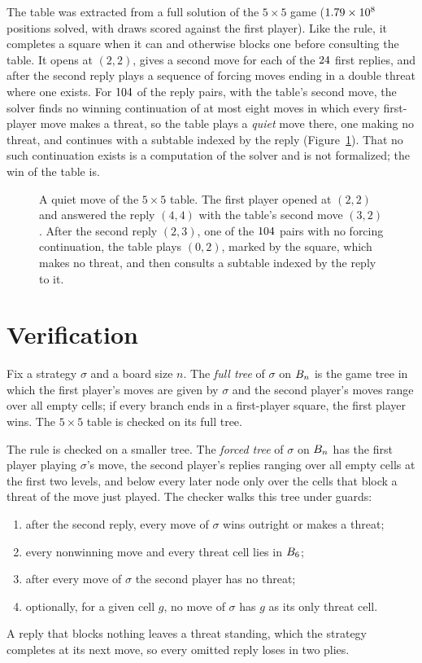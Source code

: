 \documentclass[11pt]{amsart}
\theoremstyle{definition}
\theoremstyle{remark}
\begin{document}
The table was extracted from a full solution of the $5 \times 5$ game
($1.79 \times 10^8$ positions solved, with draws scored against the
first player). Like the rule, it completes a square when it can and
otherwise blocks one before consulting the table. It opens at $(2,2)$,
gives a second move for each of the $24$ first replies,
and after the second reply plays a sequence of forcing moves ending in
a double threat where one exists. For $104$ of the reply
pairs, with the table's second move, the solver finds no winning
continuation of at most eight moves in which every first-player move
makes a threat, so the table plays a \emph{quiet} move there, one
making no threat, and continues with a subtable indexed by the reply
(Figure~\ref{fig:five}). That no such continuation exists is a
computation of the solver and is not formalized; the win of the table
is.

\begin{figure}[ht]
\centering

\caption{A quiet move of the $5 \times 5$ table. The first player
opened at $(2,2)$ and answered the reply $(4,4)$ with the
table's second move $(3,2)$. After the second reply $(2,3)$, one of the
$104$ pairs with no forcing continuation, the table plays
$(0,2)$, marked by the square, which makes no threat, and then consults
a subtable indexed by the reply to it.}
\label{fig:five}
\end{figure}

\section{Verification}\label{sec:verify}

Fix a strategy $\sigma$ and a board size $n$. The \emph{full tree} of
$\sigma$ on $B_n$ is the game tree in which the first player's
moves are given by $\sigma$ and the second player's moves range over
all empty cells; if every branch ends in a first-player square, the
first player wins. The
$5 \times 5$ table is checked on its full tree.

The rule is checked on a smaller tree. The \emph{forced tree} of
$\sigma$ on $B_n$ has the first player playing $\sigma$'s move,
the second player's replies ranging over all empty cells at the first
two levels, and below every later node only over the cells that block
a threat of the move just played. The checker walks this tree under
guards:
\begin{enumerate}
\item[(G1)] after the second reply, every move of $\sigma$ wins
  outright or makes a threat;
\item[(G2)] every nonwinning move and every threat cell lies in
  $B_6$;
\item[(G3)] after every move of $\sigma$ the second player has no
  threat;
\item[(G4)] optionally, for a given cell $g$, no move of $\sigma$ has
  $g$ as its only threat cell.
\end{enumerate}
A reply that blocks nothing leaves a threat standing, which the
strategy completes at its next move, so every omitted reply loses in
two plies.
\end{document}
